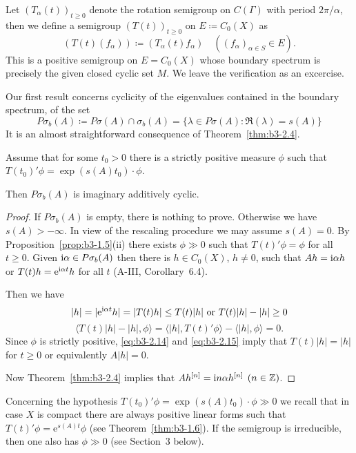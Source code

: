\begin{examples}
\begin{enumerate}[\upshape (i), wide, labelindent=.5em]
	Let $(T_{\alpha}(t))_{t \geq 0}$ denote the rotation semigroup on $C(\Gamma)$ with period $2\pi/\alpha$, then we define a semigroup $(T(t))_{t \geq 0}$ on $E \coloneqq C_{0}(X)$ as
	\[
	(T(t)(f_{\alpha})) \coloneqq (T_{\alpha}(t)f_{\alpha}) \quad ((f_{\alpha})_{\alpha \in S} \in E).
	\]
	This is a positive semigroup on $E = C_{0}(X)$ whose boundary spectrum is precisely the given closed cyclic set $M$.
	We leave the verification as an excercise.
	
\end{enumerate}
\end{examples}
Our first result concerns cyclicity of the eigenvalues contained in the boundary spectrum, \ie of the set
	\[
	P\sigma_{b}(A) \coloneqq P\sigma(A) \cap \sigma_{b}(A) = \{\lambda \in P\sigma(A) \colon \Re(\lambda)  = s(A)\}
	\]
	It is an almost straightforward consequence of Theorem~\ref{thm:b3-2.4}.
	\begin{proposition}\label{prop:b3-2.7}
		
		Assume that for some $t_{0} > 0$ there is a strictly positive measure $\phi$ such that $T(t_{0})'\phi = \exp(s(A)t_{0})\cdot\phi$.
		
		Then $P\sigma_{b}(A)$ is imaginary additively cyclic.
	\end{proposition}
\begin{proof}
If $P\sigma_{b}(A)$ is empty, there is nothing to prove.
Otherwise we have $s(A) > -\infty$.
In view of the rescaling procedure we may assume $s(A) = 0$.
By Proposition~\ref{prop:b3-1.5}(ii) there exists $\phi \gg 0$ such that $T(t)'\phi = \phi$ for all $t \geq 0$.
Given $\mathrm{i} \alpha \in P\sigma_{b}(A)$ then there is $h \in C_{0}(X)$, $h \neq 0$, such that $Ah = \mathrm{i}\alpha h$ or $T(t)h = \mathrm{e}^{\mathrm{i}\alpha t}h$ for all $t$ (A-III, Corollary~6.4).

	Then we have
	\begin{equation}\label{eq:b3-2.14}
		|h| = |\mathrm{e}^{\mathrm{i}\alpha t}h| = |T(t)h| \leq T(t)|h| \text{ or } T(t)|h| - |h| \geq 0
	\end{equation}
	\begin{equation}\label{eq:b3-2.15}
		\langle T(t)|h| - |h|,\phi \rangle = \langle |h|,T(t)'\phi \rangle - \langle |h|,\phi \rangle = 0.
	\end{equation}
	Since $\phi$ is strictly positive, \eqref{eq:b3-2.14}  and \eqref{eq:b3-2.15} imply that $T(t)|h| = |h|$ for $t \geq 0$ or equivalently $A|h| = 0$.
	
	Now Theorem~\ref{thm:b3-2.4} implies that $Ah^{[n]} = \mathrm{i} n\alpha h^{[n]}$ $(n \in \mathbb{Z})$.
\end{proof}
Concerning the hypothesis $T(t_{0})'\phi = \exp(s(A)t_{0})\cdot\phi \gg 0$ we recall that in case $X$ is compact there are always positive linear forms such that $T(t)'\phi = \mathrm{e}^{s(A)t}\phi$ (see Theorem~\ref{thm:b3-1.6}).
If the semigroup is irreducible, then one also has $\phi \gg 0$ (see Section~3 below).

